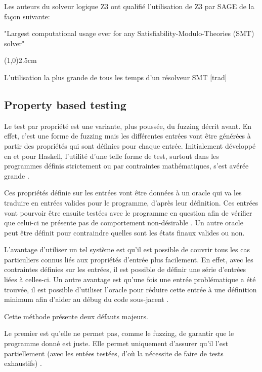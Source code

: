 \documentclass[a4paper]{report}
\begin{document}
Les auteurs du solveur logique Z3 ont qualifié l'utilisation de Z3 par SAGE de la façon suivante:
\begin{center}
"Largest computational usage ever for any Satisfiability-Modulo-Theories (SMT) solver" \cite{moura2008z3}\\
\begin{center}
\line(1,0){2.5cm}$ $ \\
\end{center}
L'utilisation la plus grande de tous les temps d'un résolveur SMT [trad] 
\end{center}

\subsection{Property based testing}

Le test par propriété est une variante, plus poussée, du fuzzing décrit avant.
En effet, c'est une forme de fuzzing mais les différentes entrées vont être générées à partir des propriétés qui sont définies pour chaque entrée.
Initialement développé en et pour Haskell, l'utilité d'une telle forme de test, surtout dans les programmes définis strictement ou par contraintes mathématiques, s'est avérée grande \cite{Paraskevopoulou2015}.

Ces propriétés définie sur les entrées vont être données à un oracle qui va les traduire en entrées valides pour le programme, d'après leur définition.
Ces entrées vont pourvoir être ensuite testées avec le programme en question afin de vérifier que celui-ci ne présente pas de comportement non-désirable \cite{Fink1997}.
Un autre oracle peut être définit pour contraindre quelles sont les états finaux valides ou non.

L'avantage d'utiliser un tel système est qu'il est possible de couvrir tous les cas particuliers connus liés aux propriétés d'entrée plus facilement.
En effet, avec les contraintes définies sur les entrées, il est possible de définir une série d'entrées liées à celles-ci.
Un autre avantage est qu'une fois une entrée problématique a été trouvée, il est possible d'utiliser l'oracle pour réduire cette entrée à une définition minimum afin d'aider au débug du code sous-jacent \cite{Papadakis2011}.

Cette méthode présente deux défauts majeurs.

Le premier est qu'elle ne permet pas, comme le fuzzing, de garantir que le programme donné est juste.
Elle permet uniquement d'assurer qu'il l'est partiellement (avec les entées testées, d'où la nécessite de faire de tests exhaustifs) \cite{Papadakis2011}.
\end{document}
